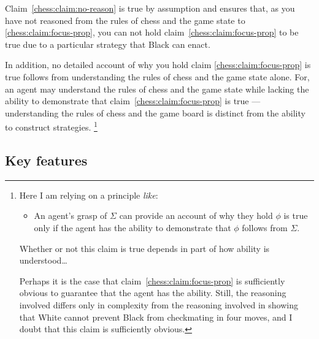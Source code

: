 \documentclass[10pt]{article}
\begin{document}
Claim~\ref{chess:claim:no-reason} is true by assumption and ensures that, as you have not reasoned from the rules of chess and the game state to \ref{chess:claim:focus-prop}, you can not hold claim~\ref{chess:claim:focus-prop} to be true due to a particular strategy that Black can enact.

In addition, no detailed account of why you hold claim \ref{chess:claim:focus-prop} is true follows from understanding the rules of chess and the game state alone.
For, an agent may understand the rules of chess and the game state while lacking the ability to demonstrate that claim~\ref{chess:claim:focus-prop} is true --- understanding the rules of chess and the game board is distinct from the ability to construct strategies.\nolinebreak
\footnote{
  Here I am relying on a principle \emph{like}:
  \begin{itemize}
  \item An agent's grasp of \(\Sigma\) can provide an account of why they hold \(\phi\) is true only if the agent has the ability to demonstrate that \(\phi\) follows from \(\Sigma\).
  \end{itemize}
  {
    \color{red}
    Whether or not this claim is true depends in part of how ability is understood\dots
  }

  Perhaps it is the case that claim~\ref{chess:claim:focus-prop} is sufficiently obvious to guarantee that the agent has the ability.
  Still, the reasoning involved differs only in complexity from the reasoning involved in showing that White cannot prevent Black from checkmating in four moves, and I doubt that this claim is sufficiently obvious.
}

\subsection{Key features}
\label{sec:key-features}
\end{document}
